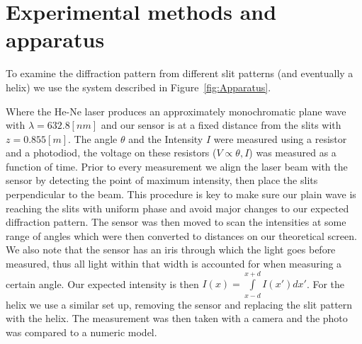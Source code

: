 \section{Experimental methods and apparatus}\label{sec:experimental-technique-and-apparatus}
To examine the diffraction pattern from different slit patterns (and eventually a helix) we use the system described in Figure~\ref{fig:Apparatus}.

Where the He-Ne laser produces an approximately monochromatic plane wave with $\lambda=632.8 [nm]$ and our sensor is at a fixed distance from the slits with $z=0.855 [m]$.
The angle $\theta$ and the Intensity $I$ were measured using a resistor and a photodiod, the voltage on these resistors ($V\propto\theta,I$) was
measured as a function of time.
Prior to every measurement we align the laser beam with the sensor by detecting the point of maximum intensity, then place the slits perpendicular to
the beam.
This procedure is key to make sure our plain wave is reaching the slits with uniform phase and avoid major changes to our expected diffraction pattern.
The sensor was then moved to scan the intensities at some range of angles which were then converted to distances on our theoretical screen. We also
note that the sensor has an iris through which the light goes before measured, thus all light within that width is accounted for when measuring a
certain angle.
Our expected intensity is then $I(x)=\int\limits_{x-d}^{x+d}I(x')dx'$.
For the helix we use a similar set up, removing the sensor and replacing the slit pattern with the helix.
The measurement was then taken with a camera and the photo was compared to a numeric model.